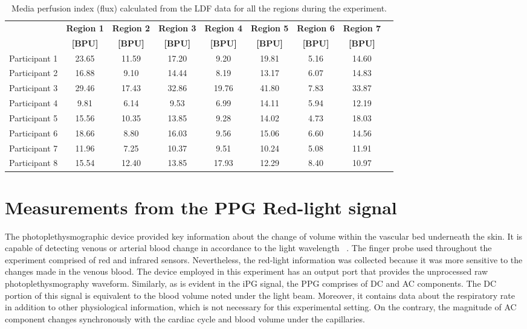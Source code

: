 \begin{table}[!htbp]
	\caption[Calculated media perfusion index from the LDF device in BPU]{Media perfusion index (flux) calculated from the LDF data for all the regions during the experiment.}
	\label{tbl:LDF flow}
	\centering \small
	\begin{tabular}{p{1.9cm}cccccccc}
		\toprule
		& \textbf{Region 1}
		& \textbf{Region 2}
		& \textbf{Region 3}
		& \textbf{Region 4}
		& \textbf{Region 5}
		& \textbf{Region 6}
		& \textbf{Region 7} \\
		& \textbf{[BPU]}
		& \textbf{[BPU]}
		& \textbf{[BPU]}		
		& \textbf{[BPU]}		
		& \textbf{[BPU]}
		& \textbf{[BPU]}
		& \textbf{[BPU]}\\\midrule
		Participant 1 & 23.65 & 11.59 & 17.20 &  9.20 & 19.81 & 5.16 & 14.60 \\  
		Participant 2 & 16.88 &  9.10 & 14.44 &  8.19 & 13.17 & 6.07 & 14.83 \\  
		Participant 3 & 29.46 & 17.43 & 32.86 & 19.76 & 41.80 & 7.83 & 33.87 \\  
		Participant 4 &  9.81 &  6.14 &  9.53 &  6.99 & 14.11 & 5.94 & 12.19 \\  
		Participant 5 & 15.56 & 10.35 & 13.85 &  9.28 & 14.02 & 4.73 & 18.03 \\  
		Participant 6 & 18.66 &  8.80 & 16.03 &  9.56 & 15.06 & 6.60 & 14.56 \\  
		Participant 7 & 11.96 &  7.25 & 10.37 &  9.51 & 10.24 & 5.08 & 11.91 \\  
		Participant 8 & 15.54 & 12.40 & 13.85 & 17.93 & 12.29 & 8.40 & 10.97 \\  
		\bottomrule
	\end{tabular}
\end{table}


\section{Measurements from the PPG Red-light signal}
\label{section comparison PPG}
The photoplethysmographic device provided key information about the change of volume within the vascular bed underneath the skin. It is capable of detecting venous or arterial blood change in accordance to the light wavelength ~\cite{almond1988noninvasive}. The finger probe used throughout the experiment comprised of red and infrared sensors. Nevertheless, the red-light information was collected because it was more sensitive to the changes made in the venous blood. The device employed in this experiment has an output port that provides the unprocessed raw photoplethysmography waveform. Similarly, as is evident in the iPG signal, the PPG comprises of DC and AC components. The DC portion of this signal is equivalent to the blood volume noted under the light beam. Moreover, it contains data about the respiratory rate in addition to other physiological information, which is not necessary for this experimental setting. On the contrary, the magnitude of AC component changes synchronously with the cardiac cycle and blood volume under the capillaries. 

